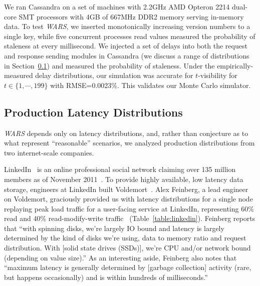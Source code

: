 \documentclass{vldb}
\newcommand{\subsectionskip}{-0em}
\begin{document}
We ran Cassandra on a set of machines with 2.2GHz AMD Opteron 2214
dual-core SMT processors with 4GB of 667MHz DDR2 memory serving
in-memory data.  To test \textit{WARS}, we inserted monotonically
increasing version numbers to a single key, while five concurrent
processes read values measured the probability of staleness at every
millisecond.  We injected a set of delays into both the request and
response sending modules in Cassandra (we discuss a range of
distributions in Section~\ref{sec:latencies}) and measured the
probability of staleness.  Under the empirically-measured delay
distributions, our simulation was accurate for $t$-visibility for
$t\in\{1,\cdots,199\}$ with RMSE=0.0023\%.  This validates our Monte
Carlo simulator.

\vspace{\subsectionskip}\subsection{Production Latency Distributions}
\label{sec:latencies}

\textit{WARS} depends only on latency distributions, and, rather than
conjecture as to what represent ``reasonable'' scenarios, we analyzed
production distributions from two internet-scale companies.

LinkedIn~\cite{linkedin} is an online professional social network
claiming over 135 million members as of November
2011~\cite{linkedinmembers}. To provide highly available, low latency
data storage, engineers at LinkedIn built Voldemort~\cite{voldemort,
  voldemortpub}.  Alex Feinberg, a lead engineer on Voldemort,
graciously provided us with latency distributions for a single node
replaying peak load traffic for a user-facing service at LinkedIn,
representing 60\% read and 40\% read-modify-write
traffic~\cite{feinbergpc} (Table~\ref{table:linkedin}).  Feinberg
reports that ``with spinning disks, we're largely IO bound and latency
is largely determined by the kind of disks we're using, data to memory
ratio and request distribution.  With [solid state drives (SSDs)],
we're CPU and/or network bound (depending on value size).''  As an
interesting aside, Feinberg also notes that ``maximum latency is
generally determined by [garbage collection] activity (rare, but
happens occasionally) and is within hundreds of milliseconds.''
\end{document}
